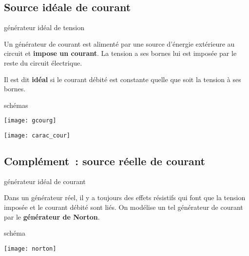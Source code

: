\documentclass[../main/main.tex]{subfiles}
\begin{document}
\subsection{Source idéale de courant}

\begin{tcbraster}[raster columns=2, raster equal height=rows]
    \begin{defi}[label=def:gentens]{générateur idéal de tension}

        Un générateur de courant est alimenté par une source d'énergie
        extérieure au circuit et \textbf{impose un courant}. La tension a ses
        bornes lui est imposée par le reste du circuit électrique.

        \tcblower

        Il est dit \textbf{idéal} si le courant débité est constante quelle que
        soit la tension à ses bornes.
    \end{defi}
    \begin{exem}[label=exem:gentens, sidebyside, righthand width=.25\linewidth]
        {schémas}
        \begin{center}
            \texttt{[image: gcourg]}
        \end{center}
        \tcblower
        \begin{center}
            \texttt{[image: carac\_cour]}
        \end{center}
    \end{exem}
\end{tcbraster}

\subsection{Complément~: source réelle de courant}
\begin{tcbraster}[raster columns=2, raster equal height=rows]
    \begin{defi}[label=def:gencour]{générateur idéal de courant}

        Dans un générateur réel, il y a toujours des effets résistifs qui font
        que la tension imposée et le courant débité sont liés. On modélise un
        tel générateur de courant par le \textbf{générateur de Norton}.

    \end{defi}
    \begin{exem}[label=exem:gentens]{schéma}
        \begin{center}
            \texttt{[image: norton]}
        \end{center}
    \end{exem}
\end{tcbraster}
\end{document}

